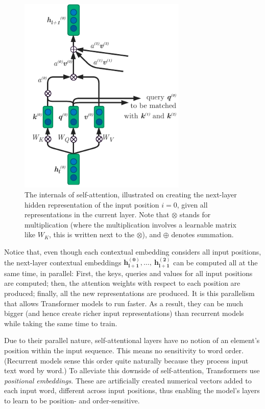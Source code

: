 \documentclass[bsc,frontabs,twoside,singlespacing,parskip,deptreport]{infthesis}
\begin{document}
{{{      \begin{figure}[h!t]
        \centering
        \includegraphics[width=8cm]{graphics/self-att}
        \cprotect\caption{The internals of self-attention, illustrated on creating the next-layer hidden representation of the input position $i=0$, given all representations in the current layer. Note that $\otimes$ stands for multiplication (where the multiplication involves a learnable matrix like $W_K$, this is written next to the $\otimes$), and $\oplus$ denotes summation.}
        \label{fig:self-att}
      \end{figure}

      Notice that, even though each contextual embedding considers all input positions, the next-layer contextual embeddings $\bm{h_{l+1}^{(0)}},\ldots,\ \bm{h_{l+1}^{(2)}}$ can be computed all at the same time, in parallel: First, the keys, queries and values for all input positions are computed; then, the attention weights with respect to each position are produced; finally, all the new representations are produced. It is this parallelism that allows Transformer models to run faster. As a result, they can be much bigger (and hence create richer input representations) than recurrent models while taking the same time to train.

      Due to their parallel nature, self-attentional layers have no notion of an element's position within the input sequence. This means no sensitivity to word order. (Recurrent models sense this order quite naturally because they process input text word by word.) To alleviate this downside of self-attention, Transformers use \textit{positional embeddings}. These are artificially created numerical vectors added to each input word, different across input positions, thus enabling the model's layers to learn to be position- and order-sensitive.

}}}
\end{document}
